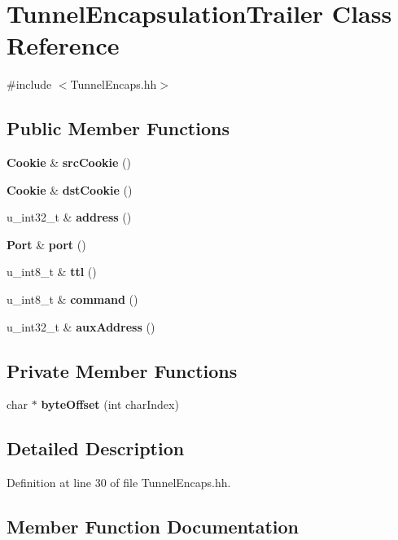 \section{Tunnel\+Encapsulation\+Trailer Class Reference}
\label{classTunnelEncapsulationTrailer}


{\ttfamily \#include $<$Tunnel\+Encaps.\+hh$>$}

\subsection*{Public Member Functions}
\begin{DoxyCompactItemize}
\item 
{\bf Cookie} \& {\bf src\+Cookie} ()
\item 
{\bf Cookie} \& {\bf dst\+Cookie} ()
\item 
u\+\_\+int32\+\_\+t \& {\bf address} ()
\item 
{\bf Port} \& {\bf port} ()
\item 
u\+\_\+int8\+\_\+t \& {\bf ttl} ()
\item 
u\+\_\+int8\+\_\+t \& {\bf command} ()
\item 
u\+\_\+int32\+\_\+t \& {\bf aux\+Address} ()
\end{DoxyCompactItemize}
\subsection*{Private Member Functions}
\begin{DoxyCompactItemize}
\item 
char $\ast$ {\bf byte\+Offset} (int char\+Index)
\end{DoxyCompactItemize}


\subsection{Detailed Description}


Definition at line 30 of file Tunnel\+Encaps.\+hh.



\subsection{Member Function Documentation}
